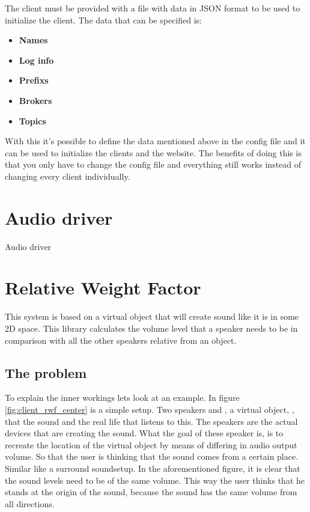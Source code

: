 The client must be provided with a file with data in JSON format to be used to initialize the client. The data that can be specified is:
\small{
\begin{itemize} [noitemsep, nolistsep]
	\item \textbf {Names}
	\item \textbf {Log info}
	\item \textbf {Prefixs}
	\item \textbf {Brokers}
	\item \textbf {Topics\\}
\end{itemize}
}
With this it's possible to define the data mentioned above in the config file and it can be used to initialize the clients and the website. The benefits of doing this is that you only have to change the config file and everything still works instead of changing every client individually.

\section{Audio driver}
\label{sec:client_audio_driver}
Audio driver

\section{Relative Weight Factor}
\label{sec:client_relative_weight_factor}

This system is based on a virtual object that will create sound like it is in some 2D space.
This library calculates the volume level that a speaker needs to be in comparison with all the other speakers relative from an object.

\subsection{The problem}
\label{sub:client_rwf_the_problem}

To explain the inner workings lets look at an example.
In figure \ref{fig:client_rwf_center} is a simple setup. Two speakers  and , a virtual object, , that  the sound and the real life  that listens to this.
The speakers are the actual devices that are creating the sound.
What the goal of these speaker is, is to recreate the location of the virtual object by means of differing in audio output volume.
So that the user is thinking that the sound comes from a certain place.
Similar like a surround sound\footnotemark setup.
In the aforementioned figure, it is clear that the sound levels need to be of the same volume.
This way the user thinks that he stands at the origin of the sound, because the sound has the same volume from all directions.

